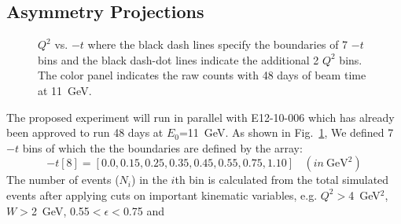 \subsection{Asymmetry Projections}
\begin{figure}[!ht]
 \begin{center}
   \caption[$Q^{2}$ vs. $-t$]{\footnotesize{$Q^{2}$ vs. $-t$ where the black
       dash lines specify the boundaries of 7 $-t$ bins and the black dash-dot lines indicate the additional 2 $Q^{2}$ bins. 
       The color panel indicates the raw counts with 48 days of beam time at 11~GeV.}}
  \label{Q2_t_bin}
  \end{center}
\end{figure}
The proposed experiment will run in parallel with E12-10-006 which has already
been approved to run 48 days at $E_{0}$=11~GeV.  As shown in
Fig.~\ref{Q2_t_bin}, We defined 7 $-t$ bins of which the the boundaries are
defined by the array:
 \begin{equation}
   -t[8] = [0.0, 0.15, 0.25, 0.35, 0.45, 0.55, 0.75, 1.10]~~~~(in~\mathrm{GeV^{2}})
 \end{equation}
The number of events ($N_{i}$) in the $i$th bin is calculated from the total
simulated events after applying cuts on important kinematic variables,
e.g. $Q^{2}>$4~GeV$^{2}$, $W>$2~GeV, 0.55$<\epsilon<$0.75 and
